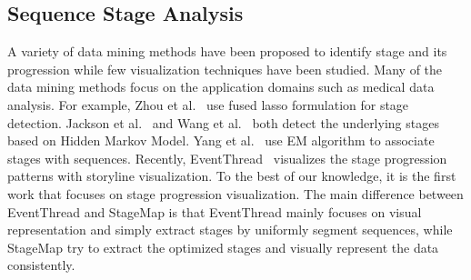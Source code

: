 \subsection{Sequence Stage Analysis}

A variety of data mining methods have been proposed to identify stage and its progression while few visualization techniques have been studied. Many of the data mining methods focus on the application domains such as medical data analysis. For example, Zhou et al.~\cite{zhou2013modeling} use fused lasso formulation for stage detection. Jackson et al.~\cite{jackson2003multistate} and Wang et al.~\cite{lu2016exploring} both detect the underlying stages based on Hidden Markov Model. Yang et al.~\cite{yang2014finding} use EM algorithm to associate stages with sequences. Recently, EventThread~\cite{guo2018eventthread} visualizes the stage progression patterns with storyline visualization. To the best of our knowledge, it is the first work that focuses on stage progression visualization. The main difference between EventThread and StageMap is that EventThread mainly focuses on visual representation and simply extract stages by uniformly segment sequences, while StageMap try to extract the optimized stages and visually represent the data consistently. 

